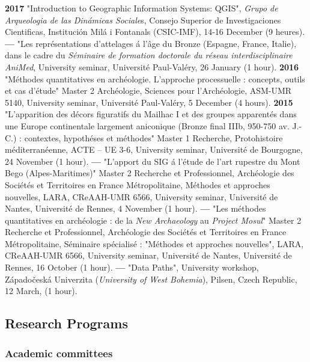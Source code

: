 \documentclass[11pt]{report} %
\begin{document}
\textbf{2017 }"Introduction to Geographic Information Systems: QGIS", \textit{Grupo de Arqueologia de las Din\'{a}micas Sociale}s, Consejo Superior de Investigaciones Cientificas, Instituci\'{o}n Mil\'{a} i Fontanals (CSIC-IMF), 14-16 December (9 heures).\textbf{}
\smallbreak
\textbf{---  }"Les repr\'{e}sentations d'attelages \'{a} l'\^{a}ge du Bronze (Espagne, France, Italie), dans le cadre du \textit{S\'{e}minaire de formation doctorale du r\'{e}seau interdisciplinaire AniMed}, University seminar, Universit\'{e} Paul-Val\'{e}ry, 26 January (1 hour).
\smallbreak
\textbf{2016 }"M\'{e}thodes quantitatives en arch\'{e}ologie. L'approche processuelle : concepts, outils et cas d'\'{e}tude" Master 2 Arch\'{e}ologie, Sciences pour l'Arch\'{e}ologie, ASM-UMR 5140, University seminar, Universit\'{e} Paul-Val\'{e}ry, 5 December (4 hours).
\smallbreak
\textbf{2015 }"L'apparition des d\'{e}cors figuratifs du Mailhac I et des groupes apparent\'{e}s dans une Europe continentale largement aniconique (Bronze final IIIb, 950-750 av. J.-C.) : contextes, hypoth\'{e}ses et m\'{e}thodes" Master 1 Recherche, Protohistoire m\'{e}diterran\'{e}enne, ACTE -- UE 3-6, University seminar, Universit\'{e} de Bourgogne, 24 November (1 hour).
\smallbreak
\textbf{---  }"L'apport du SIG \'{a} l'\'{e}tude de l'art rupestre du Mont Bego (Alpes-Maritimes)" Master 2 Recherche et Professionnel, Arch\'{e}ologie des Soci\'{e}t\'{e}s et Territoires en France M\'{e}tropolitaine, M\'{e}thodes et approches nouvelles, LARA, CReAAH-UMR 6566, University seminar, Universit\'{e} de Nantes, Universit\'{e} de Rennes, 4 November (1 hour).
\smallbreak
\textbf{---  }"Les m\'{e}thodes quantitatives en arch\'{e}ologie : de la \textit{New Archaeology} au \textit{Project Mosul}" Master 2 Recherche et Professionnel, Arch\'{e}ologie des Soci\'{e}t\'{e}s et Territoires en France M\'{e}tropolitaine, S\'{e}minaire sp\'{e}cialis\'{e} : "M\'{e}thodes et approches nouvelles", LARA, CReAAH-UMR 6566, University seminar, Universit\'{e} de Nantes, Universit\'{e} de Rennes, 16 October (1 hour).
\smallbreak
\textbf{---  }"Data Paths", University workshop, Z\'{a}pado\v{c}esk\'{a} Univerzita (\textit{University of West Bohemia}), Pilsen, Czech Republic, 12 March, (1 hour).

\subsection*{Research Programs}

\subsubsection*{Academic committees}
\end{document}
